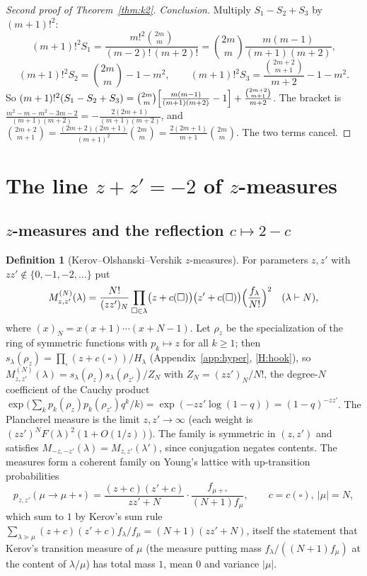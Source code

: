 \documentclass[11pt]{article}
\theoremstyle{definition}
\newtheorem{definition}[theorem]{Definition}
\theoremstyle{remark}
\begin{document}
\begin{proof}[Second proof of Theorem~\ref{thm:k2}]
\emph{Conclusion.} Multiply $S_1-S_2+S_3$ by $(m+1)!^2$:
\[
(m+1)!^2S_1=\frac{m!^2\binom{2m}m}{(m-2)!\,(m+2)!}=\binom{2m}m\frac{m(m-1)}{(m+1)(m+2)},
\]
\[
(m+1)!^2S_2=\binom{2m}m-1-m^2,\qquad
(m+1)!^2S_3=\frac{\binom{2m+2}{m+1}}{m+2}-1-m^2 .
\]
So $(m+1)!^2(S_1-S_2+S_3)=\binom{2m}m\Bigl[\frac{m(m-1)}{(m+1)(m+2)}-1\Bigr]+\frac{\binom{2m+2}{m+1}}{m+2}$. The bracket is $\frac{m^2-m-m^2-3m-2}{(m+1)(m+2)}=-\frac{2(2m+1)}{(m+1)(m+2)}$, and $\binom{2m+2}{m+1}=\frac{(2m+2)(2m+1)}{(m+1)^2}\binom{2m}m=\frac{2(2m+1)}{m+1}\binom{2m}m$. The two terms cancel.
\end{proof}

\section{The line $z+z'=-2$ of $z$-measures}\label{sec:zline}

\subsection{$z$-measures and the reflection $c\mapsto2-c$}

\begin{definition}[Kerov--Olshanski--Vershik $z$-measures]
For parameters $z,z'$ with $zz'\notin\{0,-1,-2,\dots\}$ put
\[
M^{(N)}_{z,z'}(\lambda)=\frac{N!}{(zz')_N}\prod_{\square\in\lambda}\bigl(z+c(\square)\bigr)\bigl(z'+c(\square)\bigr)\Bigl(\frac{f_\lambda}{N!}\Bigr)^2\quad(\lambda\vdash N),
\]
where $(x)_N=x(x+1)\cdots(x+N-1)$. Let $\rho_z$ be the specialization of the ring of symmetric functions with $p_k\mapsto z$ for all $k\ge1$; then $s_\lambda(\rho_z)=\prod_\square(z+c(\square))/H_\lambda$ (Appendix~\ref{app:hyper}, \ref{H:hook}), so $M^{(N)}_{z,z'}(\lambda)=s_\lambda(\rho_z)s_\lambda(\rho_{z'})/Z_N$ with $Z_N=(zz')_N/N!$, the degree-$N$ coefficient of the Cauchy product $\exp\bigl(\sum_kp_k(\rho_z)p_k(\rho_{z'})q^k/k\bigr)=\exp(-zz'\log(1-q))=(1-q)^{-zz'}$. The Plancherel measure is the limit $z,z'\to\infty$ (each weight is $(zz')^NF(\lambda)^2(1+O(1/z))$). The family is symmetric in $(z,z')$ and satisfies $M_{-z,-z'}(\lambda)=M_{z,z'}(\lambda')$, since conjugation negates contents. The measures form a coherent family on Young's lattice with up-transition probabilities
\begin{equation}\label{eq:zgrowth}
p_{z,z'}(\mu\to\mu+\square)=\frac{(z+c)(z'+c)}{zz'+N}\cdot\frac{f_{\mu+\square}}{(N+1)f_\mu},\qquad c=c(\square),\ |\mu|=N,
\end{equation}
which sum to $1$ by Kerov's sum rule $\sum_{\lambda\gtrdot\mu}(z+c)(z'+c)f_\lambda/f_\mu=(N+1)(zz'+N)$, itself the statement that Kerov's transition measure of $\mu$ (the measure putting mass $f_\lambda/((N+1)f_\mu)$ at the content of $\lambda/\mu$) has total mass $1$, mean $0$ and variance $|\mu|$.
\end{definition}
\end{document}
